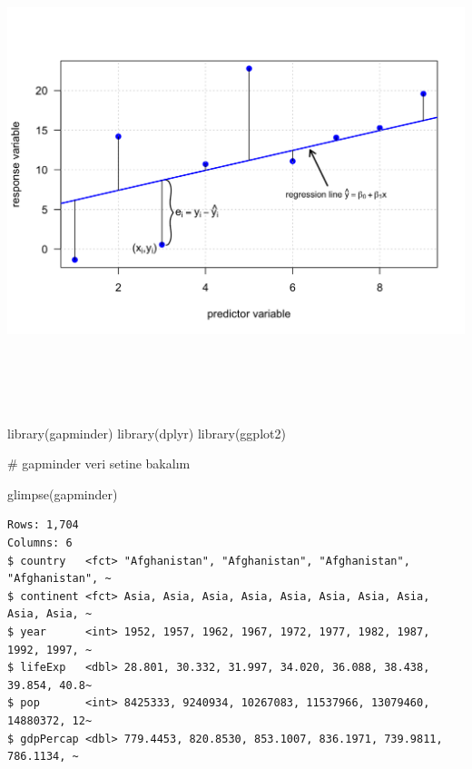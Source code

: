 \documentclass[
  letterpaper,
  DIV=11,
  numbers=noendperiod]{scrreprt}
\newenvironment{Shaded}{\begin{snugshade}}{\end{snugshade}}
\newcommand{\CommentTok}[1]{\textcolor[rgb]{0.37,0.37,0.37}{#1}}
\newcommand{\FunctionTok}[1]{\textcolor[rgb]{0.28,0.35,0.67}{#1}}
\newcommand{\NormalTok}[1]{\textcolor[rgb]{0.00,0.23,0.31}{#1}}
\begin{document}
\begin{center}
\includegraphics[width=9.375in,height=5.4375in]{images/regresyon.png}
\end{center}

\begin{Shaded}
\begin{Highlighting}[]
\FunctionTok{library}\NormalTok{(gapminder)}
\FunctionTok{library}\NormalTok{(dplyr)}
\FunctionTok{library}\NormalTok{(ggplot2)}

\CommentTok{\# gapminder veri setine bakalım}

\FunctionTok{glimpse}\NormalTok{(gapminder)}
\end{Highlighting}
\end{Shaded}

\begin{verbatim}
Rows: 1,704
Columns: 6
$ country   <fct> "Afghanistan", "Afghanistan", "Afghanistan", "Afghanistan", ~
$ continent <fct> Asia, Asia, Asia, Asia, Asia, Asia, Asia, Asia, Asia, Asia, ~
$ year      <int> 1952, 1957, 1962, 1967, 1972, 1977, 1982, 1987, 1992, 1997, ~
$ lifeExp   <dbl> 28.801, 30.332, 31.997, 34.020, 36.088, 38.438, 39.854, 40.8~
$ pop       <int> 8425333, 9240934, 10267083, 11537966, 13079460, 14880372, 12~
$ gdpPercap <dbl> 779.4453, 820.8530, 853.1007, 836.1971, 739.9811, 786.1134, ~
\end{verbatim}
\end{document}
